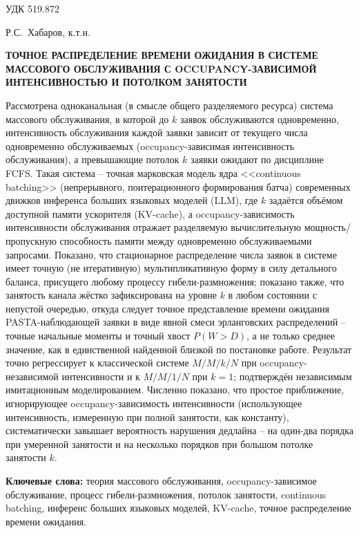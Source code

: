 \documentclass[12pt,a4paper]{article}
\newcommand{\keywordslabel}{\textbf{Ключевые слова: }}
\begin{document}
\sloppy

\noindent УДК 519.872

\bigskip
\noindent Р.С.~Хабаров, к.т.н.

\bigskip
\begin{center}
\begin{minipage}{0.9\linewidth}
\centering
{\large\bfseries ТОЧНОЕ РАСПРЕДЕЛЕНИЕ ВРЕМЕНИ ОЖИДАНИЯ В СИСТЕМЕ МАССОВОГО ОБСЛУЖИВАНИЯ С OCCUPANCY-ЗАВИСИМОЙ ИНТЕНСИВНОСТЬЮ И ПОТОЛКОМ ЗАНЯТОСТИ}
\end{minipage}
\end{center}

\bigskip
\noindent\small
Рассмотрена одноканальная (в смысле общего разделяемого ресурса) система массового обслуживания, в которой до $k$ заявок обслуживаются одновременно, интенсивность обслуживания каждой заявки зависит от текущего числа одновременно обслуживаемых (occupancy-зависимая интенсивность обслуживания), а превышающие потолок $k$ заявки ожидают по дисциплине FCFS. Такая система -- точная марковская модель ядра <<continuous batching>> (непрерывного, поитерационного формирования батча) современных движков инференса больших языковых моделей (LLM), где $k$ задаётся объёмом доступной памяти ускорителя (KV-cache), а occupancy-зависимость интенсивности обслуживания отражает разделяемую вычислительную мощность/пропускную способность памяти между одновременно обслуживаемыми запросами. Показано, что стационарное распределение числа заявок в системе имеет точную (не итеративную) мультипликативную форму в силу детального баланса, присущего любому процессу гибели-размножения; показано также, что занятость канала жёстко зафиксирована на уровне $k$ в любом состоянии с непустой очередью, откуда следует точное представление времени ожидания PASTA-наблюдающей заявки в виде явной смеси эрланговских распределений -- точные начальные моменты и точный хвост $P(W>D)$, а не только среднее значение, как в единственной найденной близкой по постановке работе. Результат точно регрессирует к классической системе $M/M/k/N$ при occupancy-независимой интенсивности и к $M/M/1/N$ при $k=1$; подтверждён независимым имитационным моделированием. Численно показано, что простое приближение, игнорирующее occupancy-зависимость интенсивности (использующее интенсивность, измеренную при полной занятости, как константу), систематически завышает вероятность нарушения дедлайна -- на один-два порядка при умеренной занятости и на несколько порядков при большом потолке занятости $k$.

\medskip
\noindent\keywordslabel теория массового обслуживания, occupancy-зависимое обслуживание, процесс гибели-размножения, потолок занятости, continuous batching, инференс больших языковых моделей, KV-cache, точное распределение времени ожидания.
\normalsize
\end{document}
